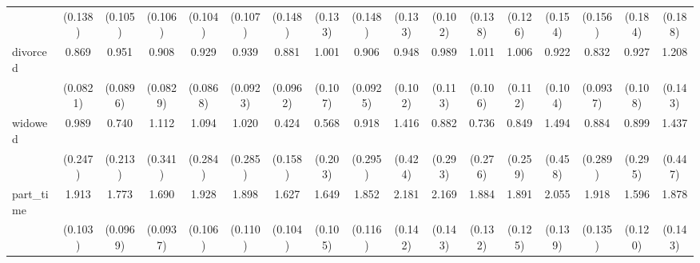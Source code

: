 {\begin{tabular}{l*{16}{c}}
                    &     (0.138)         &     (0.105)         &     (0.106)         &     (0.104)         &     (0.107)         &     (0.148)         &     (0.133)         &     (0.148)         &     (0.133)         &     (0.102)         &     (0.138)         &     (0.126)         &     (0.154)         &     (0.156)         &     (0.184)         &     (0.188)         \\
[1em]
divorced            &       0.869         &       0.951         &       0.908         &       0.929         &       0.939         &       0.881         &       1.001         &       0.906         &       0.948         &       0.989         &       1.011         &       1.006         &       0.922         &       0.832         &       0.927         &       1.208         \\
                    &    (0.0821)         &    (0.0896)         &    (0.0829)         &    (0.0868)         &    (0.0923)         &    (0.0962)         &     (0.107)         &    (0.0925)         &     (0.102)         &     (0.113)         &     (0.106)         &     (0.112)         &     (0.104)         &    (0.0937)         &     (0.108)         &     (0.143)         \\
[1em]
widowed             &       0.989         &       0.740         &       1.112         &       1.094         &       1.020         &       0.424\sym{*}  &       0.568         &       0.918         &       1.416         &       0.882         &       0.736         &       0.849         &       1.494         &       0.884         &       0.899         &       1.437         \\
                    &     (0.247)         &     (0.213)         &     (0.341)         &     (0.284)         &     (0.285)         &     (0.158)         &     (0.203)         &     (0.295)         &     (0.424)         &     (0.293)         &     (0.276)         &     (0.259)         &     (0.458)         &     (0.289)         &     (0.295)         &     (0.447)         \\
[1em]
part\_time           &       1.913\sym{***}&       1.773\sym{***}&       1.690\sym{***}&       1.928\sym{***}&       1.898\sym{***}&       1.627\sym{***}&       1.649\sym{***}&       1.852\sym{***}&       2.181\sym{***}&       2.169\sym{***}&       1.884\sym{***}&       1.891\sym{***}&       2.055\sym{***}&       1.918\sym{***}&       1.596\sym{***}&       1.878\sym{***}\\
                    &     (0.103)         &    (0.0969)         &    (0.0937)         &     (0.106)         &     (0.110)         &     (0.104)         &     (0.105)         &     (0.116)         &     (0.142)         &     (0.143)         &     (0.132)         &     (0.125)         &     (0.139)         &     (0.135)         &     (0.120)         &     (0.143)         \\

\end{tabular}}
